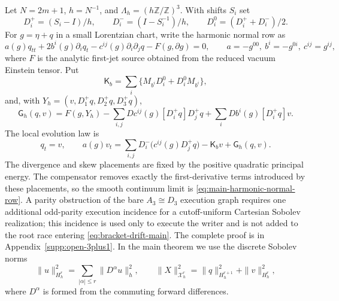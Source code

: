 \documentclass[11pt]{article}
\theoremstyle{definition}
\theoremstyle{remark}
\begin{document}
Let $N=2m+1$, $h=N^{-1}$, and
$\Lambda_h=(h\mathbb Z/\mathbb Z)^3$.  With shifts $S_i$ set
\begin{equation}
 D_i^+=(S_i-I)/h,\qquad D_i^-=(I-S_i^{-1})/h,\qquad
 D_i^0=(D_i^++D_i^-)/2.
 \label{eq:main-open-differences}
\end{equation}
For $g=\eta+q$ in a small Lorentzian chart, write the harmonic normal row as
\begin{equation}
 a(g)q_{tt}+2b^i(g)\partial_iq_t-c^{ij}(g)\partial_i\partial_jq
             -F(g,\partial g)=0,
 \qquad a=-g^{00},\ b^i=-g^{0i},\ c^{ij}=g^{ij},
 \label{eq:main-harmonic-normal-row}
\end{equation}
where $F$ is the analytic first-jet source obtained from the reduced vacuum
Einstein tensor.  Put
\begin{equation}
 \mathsf K_b=\sum_i\{M_{b^i}D_i^0+D_i^0M_{b^i}\},
 \label{eq:main-open-skew-transport}
\end{equation}
and, with $Y_h=(v,D_1^+q,D_2^+q,D_3^+q)$,
\begin{equation}
 \mathsf G_h(q,v)=F(g,Y_h)
 -\sum_{i,j}Dc^{ij}(g)[D_i^+q]D_j^+q
 +\sum_iDb^i(g)[D_i^+q]v.
 \label{eq:main-open-compensator}
\end{equation}
The local evolution law is
\begin{equation}
 \boxed{
 q_t=v,\qquad
 a(g)v_t=\sum_{i,j}D_i^-\!\bigl(c^{ij}(g)D_j^+q\bigr)
           -\mathsf K_bv+\mathsf G_h(q,v).}
 \label{eq:main-open-writer}
\end{equation}
The divergence and skew placements are fixed by the positive quadratic
principal energy.  The compensator removes exactly the first-derivative terms
introduced by these placements, so the smooth continuum limit is
\eqref{eq:main-harmonic-normal-row}.  A parity obstruction of the bare
$A_3\cong D_3$ execution graph requires one additional odd-parity execution
incidence for a cutoff-uniform Cartesian Sobolev realization; this incidence
is used only to execute the writer and is not added to the root race entering
\eqref{eq:bracket-drift-main}.  The complete proof is in
Appendix~\ref{supp:open-3plus1}.  In the main theorem we use the discrete
Sobolev norms
\begin{equation}
 \|u\|_{H_h^r}^2=\sum_{|\alpha|\le r}\|D^\alpha u\|_h^2,
 \qquad
 \|X\|_{\mathcal X_h^r}^2=\|q\|_{H_h^{r+1}}^2+\|v\|_{H_h^r}^2,
 \label{eq:main-open-sobolev-norms}
\end{equation}
where $D^\alpha$ is formed from the commuting forward differences.
\end{document}
